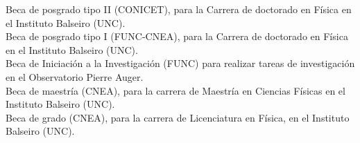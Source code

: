  Beca de posgrado tipo II (CONICET), para la Carrera de doctorado en Física en el Instituto Balseiro (UNC).\\
 Beca de posgrado tipo I (FUNC-CNEA), para la Carrera de doctorado en Física en el Instituto Balseiro (UNC).\\
 Beca de Iniciación a la Investigación (FUNC) para realizar tareas de investigación en el Observatorio Pierre Auger.\\
 Beca de maestría (CNEA), para la carrera de Maestría en Ciencias Físicas en el Instituto Balseiro (UNC).\\
 Beca de grado (CNEA), para la carrera de Licenciatura en Física, en el Instituto Balseiro (UNC).\\
\fi
\fi